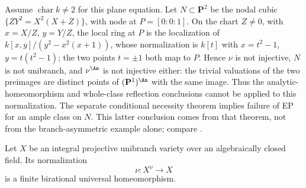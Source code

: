 \begin{example}
\label{ex:ch43-node-not-unibranch}
Assume $\operatorname{char}k\ne2$ for this plane equation.
Let $N\subset\mathbf P^2$ be the nodal cubic $\{ZY^2=X^2(X+Z)\}$, with
node at $P=[0:0:1]$.  On the chart $Z\ne0$, with $x=X/Z$,
$y=Y/Z$, the local ring at $P$ is the localization of
$k[x,y]/(y^2-x^2(x+1))$, whose normalization is $k[t]$ with
$x=t^2-1$, $y=t(t^2-1)$; the two points $t=\pm1$ both map to $P$.
Hence $\nu$ is not injective, $N$ is not unibranch, and
$\nu^{\An}$ is not injective either: the trivial valuations of the two
preimages are distinct points of $(\mathbf P^1)^{\An}$ with the same
image.  Thus the analytic-homeomorphism and whole-class reflection conclusions
cannot be applied to this normalization.  The separate conditional
necessity theorem  implies failure of EP
for an ample class on $N$.  This latter conclusion comes from that
theorem, not from the branch-asymmetric example alone; compare
.
\end{example}

\begin{lemma}\label{lem:bj-unibranch-normalization-universal}
Let $X$ be an integral projective unibranch variety over an algebraically
closed field.
Its normalization
\[
                         \nu:X^\nu\longrightarrow X
\tag{43.19}\label{eq:bj-unibranch-normalization}
\]
is a finite birational universal homeomorphism.
\end{lemma}

